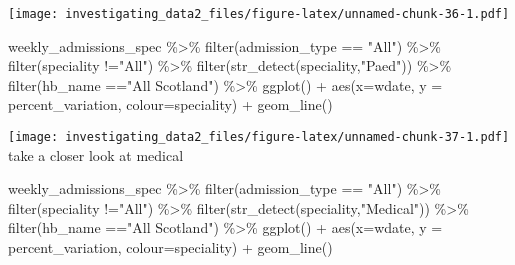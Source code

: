 \documentclass[
]{article}
\newenvironment{Shaded}{\begin{snugshade}}{\end{snugshade}}
\newcommand{\AttributeTok}[1]{\textcolor[rgb]{0.77,0.63,0.00}{#1}}
\newcommand{\FunctionTok}[1]{\textcolor[rgb]{0.00,0.00,0.00}{#1}}
\newcommand{\NormalTok}[1]{#1}
\newcommand{\SpecialCharTok}[1]{\textcolor[rgb]{0.00,0.00,0.00}{#1}}
\newcommand{\StringTok}[1]{\textcolor[rgb]{0.31,0.60,0.02}{#1}}
\begin{document}
\texttt{[image: investigating\_data2\_files/figure-latex/unnamed-chunk-36-1.pdf]}

\begin{Shaded}
\begin{Highlighting}[]
\NormalTok{weekly\_admissions\_spec }\SpecialCharTok{\%\textgreater{}\%} 
  \FunctionTok{filter}\NormalTok{(admission\_type }\SpecialCharTok{==} \StringTok{"All"}\NormalTok{) }\SpecialCharTok{\%\textgreater{}\%} 
  \FunctionTok{filter}\NormalTok{(speciality }\SpecialCharTok{!=}\StringTok{"All"}\NormalTok{) }\SpecialCharTok{\%\textgreater{}\%} 
  \FunctionTok{filter}\NormalTok{(}\FunctionTok{str\_detect}\NormalTok{(speciality,}\StringTok{"Paed"}\NormalTok{)) }\SpecialCharTok{\%\textgreater{}\%} 
  \FunctionTok{filter}\NormalTok{(hb\_name }\SpecialCharTok{==}\StringTok{"All Scotland"}\NormalTok{) }\SpecialCharTok{\%\textgreater{}\%} 
\FunctionTok{ggplot}\NormalTok{() }\SpecialCharTok{+}
\FunctionTok{aes}\NormalTok{(}\AttributeTok{x=}\NormalTok{wdate, }\AttributeTok{y =}\NormalTok{ percent\_variation, }\AttributeTok{colour=}\NormalTok{speciality) }\SpecialCharTok{+}
\FunctionTok{geom\_line}\NormalTok{()}
\end{Highlighting}
\end{Shaded}

\texttt{[image: investigating\_data2\_files/figure-latex/unnamed-chunk-37-1.pdf]}
take a closer look at medical

\begin{Shaded}
\begin{Highlighting}[]
\NormalTok{weekly\_admissions\_spec }\SpecialCharTok{\%\textgreater{}\%} 
  \FunctionTok{filter}\NormalTok{(admission\_type }\SpecialCharTok{==} \StringTok{"All"}\NormalTok{) }\SpecialCharTok{\%\textgreater{}\%} 
  \FunctionTok{filter}\NormalTok{(speciality }\SpecialCharTok{!=}\StringTok{"All"}\NormalTok{) }\SpecialCharTok{\%\textgreater{}\%} 
  \FunctionTok{filter}\NormalTok{(}\FunctionTok{str\_detect}\NormalTok{(speciality,}\StringTok{"Medical"}\NormalTok{)) }\SpecialCharTok{\%\textgreater{}\%} 
  \FunctionTok{filter}\NormalTok{(hb\_name }\SpecialCharTok{==}\StringTok{"All Scotland"}\NormalTok{) }\SpecialCharTok{\%\textgreater{}\%} 
\FunctionTok{ggplot}\NormalTok{() }\SpecialCharTok{+}
\FunctionTok{aes}\NormalTok{(}\AttributeTok{x=}\NormalTok{wdate, }\AttributeTok{y =}\NormalTok{ percent\_variation, }\AttributeTok{colour=}\NormalTok{speciality) }\SpecialCharTok{+}
\FunctionTok{geom\_line}\NormalTok{()}
\end{Highlighting}
\end{Shaded}
\end{document}
